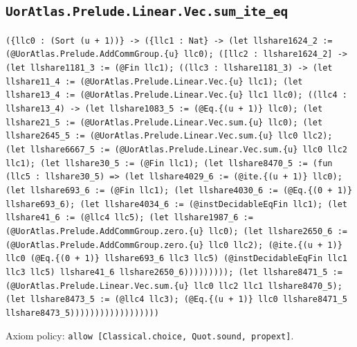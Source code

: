 \documentclass[11pt]{article}
\begin{document}
\subsection*{\texttt{UorAtlas.Prelude.Linear.Vec.sum\_ite\_eq}}
\noindent\texttt{(\{llc0 : (Sort (u + 1))\} -> (\{llc1 : Nat\} -> (let llshare1624\_2 := (@UorAtlas.Prelude.AddCommGroup.\{u\} llc0); ([llc2 : llshare1624\_2] -> (let llshare1181\_3 := (@Fin llc1); ((llc3 : llshare1181\_3) -> (let llshare11\_4 := (@UorAtlas.Prelude.Linear.Vec.\{u\} llc1); (let llshare13\_4 := (@UorAtlas.Prelude.Linear.Vec.\{u\} llc1 llc0); ((llc4 : llshare13\_4) -> (let llshare1083\_5 := (@Eq.\{(u + 1)\} llc0); (let llshare21\_5 := (@UorAtlas.Prelude.Linear.Vec.sum.\{u\} llc0); (let llshare2645\_5 := (@UorAtlas.Prelude.Linear.Vec.sum.\{u\} llc0 llc2); (let llshare6667\_5 := (@UorAtlas.Prelude.Linear.Vec.sum.\{u\} llc0 llc2 llc1); (let llshare30\_5 := (@Fin llc1); (let llshare8470\_5 := (fun (llc5 : llshare30\_5) => (let llshare4029\_6 := (@ite.\{(u + 1)\} llc0); (let llshare693\_6 := (@Fin llc1); (let llshare4030\_6 := (@Eq.\{(0 + 1)\} llshare693\_6); (let llshare4034\_6 := (@instDecidableEqFin llc1); (let llshare41\_6 := (@llc4 llc5); (let llshare1987\_6 := (@UorAtlas.Prelude.AddCommGroup.zero.\{u\} llc0); (let llshare2650\_6 := (@UorAtlas.Prelude.AddCommGroup.zero.\{u\} llc0 llc2); (@ite.\{(u + 1)\} llc0 (@Eq.\{(0 + 1)\} llshare693\_6 llc3 llc5) (@instDecidableEqFin llc1 llc3 llc5) llshare41\_6 llshare2650\_6))))))))); (let llshare8471\_5 := (@UorAtlas.Prelude.Linear.Vec.sum.\{u\} llc0 llc2 llc1 llshare8470\_5); (let llshare8473\_5 := (@llc4 llc3); (@Eq.\{(u + 1)\} llc0 llshare8471\_5 llshare8473\_5))))))))))))))))))}\par
\noindent Axiom policy: \texttt{allow [Classical.choice, Quot.sound, propext]}.\par
\end{document}
